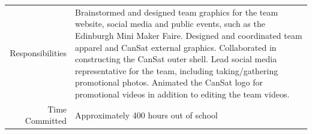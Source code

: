\documentclass[]{report}
\begin{document}
\begin{center}
\begin{longtable}{rp{13cm}}
			Responsibilities&Brainstormed and designed team graphics for the team website, social media and public events, such as the Edinburgh Mini Maker Faire. Designed and coordinated team apparel and CanSat external graphics. Collaborated in constructing the CanSat outer shell. Lead social media representative for the team, including taking/gathering promotional photos. Animated the CanSat logo for promotional videos in addition to editing the team videos.\\
			Time Committed&Approximately 400 hours out of school\\
		\end{longtable}
	\end{center}
	
\end{document}
